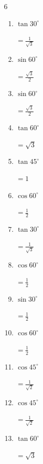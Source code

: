 \begin{multicols}{6}
\begin{enumerate}
\columnbreak %

  \item $\displaystyle \tan{30^\circ}$

        $\displaystyle =\frac{1}{\sqrt{3}}$

  \item $\displaystyle \sin{60^\circ}$

        $\displaystyle =\frac{\sqrt{3}}{2}$

  \item $\displaystyle \sin{60^\circ}$

        $\displaystyle =\frac{\sqrt{3}}{2}$

  \item $\displaystyle \tan{60^\circ}$

        $\displaystyle =\sqrt{3}$

  \item $\displaystyle \tan{45^\circ}$

        $\displaystyle =1$

  \item $\displaystyle \cos{60^\circ}$

        $\displaystyle =\frac{1}{2}$

  \item $\displaystyle \tan{30^\circ}$

        $\displaystyle =\frac{1}{\sqrt{3}}$

  \item $\displaystyle \cos{60^\circ}$

        $\displaystyle =\frac{1}{2}$

  \item $\displaystyle \sin{30^\circ}$

        $\displaystyle =\frac{1}{2}$

  \item $\displaystyle \cos{60^\circ}$

        $\displaystyle =\frac{1}{2}$

  \item $\displaystyle \cos{45^\circ}$

        $\displaystyle =\frac{1}{\sqrt{2}}$

  \item $\displaystyle \cos{45^\circ}$

        $\displaystyle =\frac{1}{\sqrt{2}}$

  \item $\displaystyle \tan{60^\circ}$

        $\displaystyle =\sqrt{3}$


\end{enumerate}
\end{multicols}
